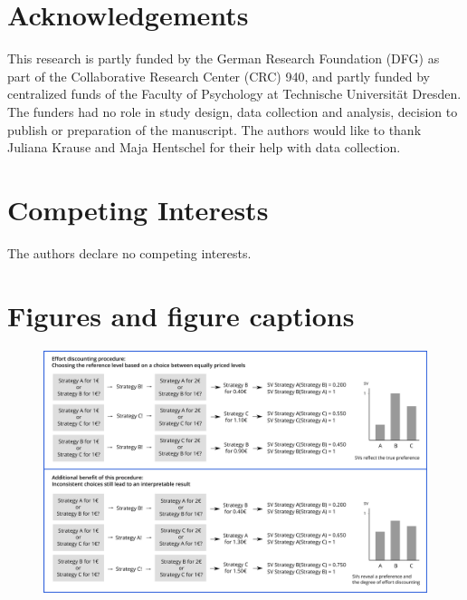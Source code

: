 \documentclass[
  man,floatsintext]{apa6}
\begin{document}
\endgroup

\newpage

\hypertarget{acknowledgements}{%
\section{Acknowledgements}\label{acknowledgements}}

This research is partly funded by the German Research Foundation (DFG) as part of the Collaborative Research Center (CRC) 940, and partly funded by centralized funds of the Faculty of Psychology at Technische Universität Dresden.
The funders had no role in study design, data collection and analysis, decision to publish or preparation of the manuscript.
The authors would like to thank Juliana Krause and Maja Hentschel for their help with data collection.

\hypertarget{competing-interests}{%
\section{Competing Interests}\label{competing-interests}}

The authors declare no competing interests.

\newpage
\setcounter{figure}{0}

\hypertarget{figures-and-figure-captions}{%
\section{Figures and figure captions}\label{figures-and-figure-captions}}

\begin{figure}
\includegraphics[width=\textwidth]{figures/Paradigm_Scheme_T2} \caption{ }\label{fig:ResponsePatternsAppendix}
\end{figure}
\end{document}
